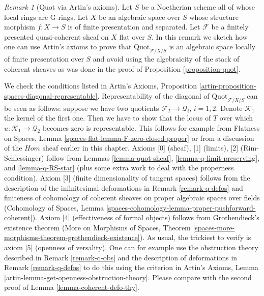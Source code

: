 \documentclass{stacks-project}
\theoremstyle{plain}
\theoremstyle{definition}
\theoremstyle{remark}
\newtheorem{remark}[subsection]{Remark}
\numberwithin{equation}{subsection}
\def\Quotfunctor{\mathrm{Quot}}
\begin{document}
\begin{remark}[Quot via Artin's axioms]
\label{remark-quot-via-artins-axioms}
Let $S$ be a Noetherian scheme all of whose local rings are G-rings.
Let $X$ be an algebraic space over $S$ whose structure morphism
$f : X \to S$ is of finite presentation and separated.
Let $\mathcal{F}$ be a finitely presented quasi-coherent sheaf
on $X$ flat over $S$. In this remark we sketch how one can
use Artin's axioms to prove that $\Quotfunctor_{\mathcal{F}/X/S}$
is an algebraic space locally of finite presentation over $S$
and avoid using the algebraicity of the stack of coherent sheaves
as was done in the proof of Proposition \ref{proposition-quot}.

\medskip\noindent
We check the conditions listed in Artin's Axioms, Proposition
\ref{artin-proposition-spaces-diagonal-representable}.
Representability of the diagonal of $\Quotfunctor_{\mathcal{F}/X/S}$
can be seen as follows: suppose we have two quotients
$\mathcal{F}_T \to \mathcal{Q}_i$, $i = 1, 2$. Denote
$\mathcal{K}_1$ the kernel of the first one. Then we have
to show that the locus of $T$ over which
$u : \mathcal{K}_1 \to \mathcal{Q}_2$ becomes zero is representable.
This follows for example from Flatness on Spaces, Lemma
\ref{spaces-flat-lemma-F-zero-closed-proper}
or from a discussion of the $\mathit{Hom}$ sheaf earlier
in this chapter. Axioms [0] (sheaf), [1] (limits), [2] (Rim-Schlessinger)
follow from Lemmas \ref{lemma-quot-sheaf},
\ref{lemma-q-limit-preserving}, and \ref{lemma-q-RS-star}
(plus some extra work to deal with the properness condition).
Axiom [3] (finite dimensionality of tangent spaces)
follows from the description of the infinitesimal
deformations in Remark \ref{remark-q-defos}
and finiteness of cohomology of coherent sheaves on proper
algebraic spaces over fields (Cohomology of Spaces, Lemma
\ref{spaces-cohomology-lemma-proper-pushforward-coherent}).
Axiom [4] (effectiveness of formal objects)
follows from Grothendieck's existence theorem
(More on Morphisms of Spaces, Theorem
\ref{spaces-more-morphisms-theorem-grothendieck-existence}).
As usual, the trickiest to verify is axiom [5] (openness of versality).
One can for example use the obstruction theory described
in Remark \ref{remark-q-obs} and the description of
deformations in Remark \ref{remark-q-defos}
to do this using the criterion in
Artin's Axioms, Lemma \ref{artin-lemma-get-openness-obstruction-theory}.
Please compare with the second proof of
Lemma \ref{lemma-coherent-defo-thy}.
\end{remark}
\end{document}
